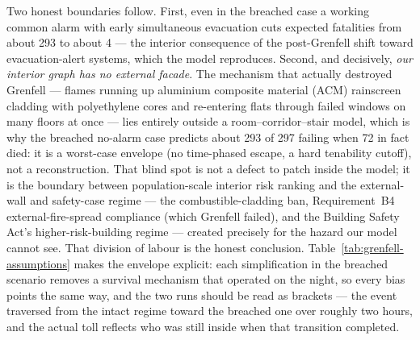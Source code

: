Two honest boundaries follow. First, even in the breached case a working common alarm
with early simultaneous evacuation cuts expected fatalities from about 293 to about 4
--- the interior consequence of the post-Grenfell shift toward evacuation-alert
systems, which the model reproduces. Second, and decisively, \emph{our interior graph
has no external facade}. The mechanism that actually destroyed Grenfell --- flames
running up aluminium composite material (ACM) rainscreen cladding with polyethylene
cores and re-entering flats through failed windows on many floors at once --- lies
entirely outside a room--corridor--stair model, which is why the breached no-alarm
case predicts about 293 of 297 failing when 72 in fact died: it is a worst-case
envelope (no time-phased escape, a hard tenability cutoff), not a reconstruction. That
blind spot is not a defect to patch inside the model; it is the boundary between
population-scale interior risk ranking and the external-wall and safety-case regime
--- the combustible-cladding ban, Requirement~B4 external-fire-spread compliance
(which Grenfell failed), and the Building Safety Act's higher-risk-building regime ---
created precisely for the hazard our model cannot see. That division of labour is the
honest conclusion. Table~\ref{tab:grenfell-assumptions} makes the envelope explicit:
each simplification in the breached scenario removes a survival mechanism that
operated on the night, so every bias points the same way, and the two runs should be
read as brackets --- the event traversed from the intact regime toward the breached
one over roughly two hours, and the actual toll reflects who was still inside when
that transition completed.

